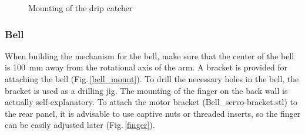 \documentclass[a4paper]{scrartcl}
\begin{document}
\begin{figure}
  \centering
  \caption{Mounting of the drip catcher} \label{drip}
\end{figure}

\subsubsection{Bell}
When building the mechanism for the bell, make sure that the center of the bell is \SI{100}{\milli\metre} away from the rotational axis of the arm. A bracket is provided for attaching the bell (Fig.\,\ref{bell_mount}). To drill the necessary holes in the bell, the bracket is used as a drilling jig. The mounting of the finger on the back wall is actually self-explanatory. To attach the motor bracket (Bell\_servo-bracket.stl) to the rear panel, it is advisable to use captive nuts or threaded inserts, so the finger can be easily adjusted later (Fig.\,\ref{finger}).
\end{document}
